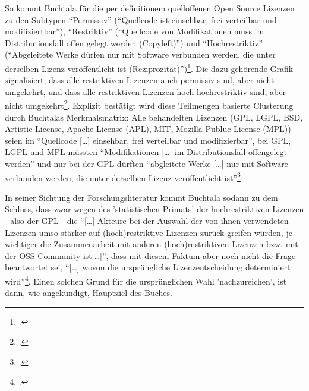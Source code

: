 \documentclass[DIV=calc,BCOR=5mm,11pt,headings=small,oneside,abstract=true, toc=bib]{scrartcl}
\begin{document}
So kommt Buchtala für die per definitionem quelloffenen Open Source Lizenzen zu
den Subtypen \enquote{Permissiv} (\enquote{Quellcode ist einsehbar, frei
verteilbar und modifiziertbar}), \enquote{Restriktiv}
(\enquote{Quellcode von Modifikationen muss im Distributionsfall offen gelegt
werden (Copyleft)}) und \enquote{Hochrestriktiv} (\enquote{Abgeleitete
Werke dürfen nur mit Software verbunden werden, die unter derselben Lizenz
veröffentlicht ist (Reziprozität)})\footcite[cf.][57 (Typo im
Original)]{Buchtala2007a}. Die dazu gehörende Grafik signalisiert, dass alle
restriktiven Lizenzen auch permissiv sind, aber nicht umgekehrt, und dass alle
restriktiven Lizenzen hoch hochrestriktiv sind, aber nicht
umgekehrt\footcite[cf.][57]{Buchtala2007a}. Explizit bestätigt wird diese
Teilmengen basierte Clusterung durch Buchtalas Merkmalsmatrix: Alle behandelten
Lizenzen (GPL, LGPL, BSD, Artistic License, Apache License (APL), MIT, Mozilla
Publuc License (MPL)) seien im \enquote{Quellcode [\ldots] einsehbar, frei
verteilbar und modifizierbar}, bei GPL, LGPL und MPL müssten
\enquote{Modifikationen [\ldots] im Distributionsfall offengelegt werden}
und nur bei der GPL dürften \enquote{abgleitete Werke [\ldots] nur mit Software
verbunden werden, die unter derselben Lizenz veröffentlicht
ist}\footcite[cf.][62]{Buchtala2007a}

In seiner Sichtung der Forschungsliteratur kommt Buchtala sodann zu dem Schluss,
dass zwar wegen des 'statistischen Primats' der hochrestriktiven Lizenzen - also
der GPL - die \enquote{[\ldots] Akteure bei der Auswahl der von ihnen verwendeten
Lizenzen umso stärker auf (hoch)restriktive Lizenzen zurück greifen würden, je
wichtiger die Zusammenarbeit mit anderen (hoch)restriktiven Lizenzen bzw. mit
der OSS-Community ist[\ldots]}, dass mit diesem Faktum aber noch nicht die
Frage beantwortet sei, \enquote{[\ldots] wovon die ursprüngliche
Lizenzentscheidung determiniert
wird}\footcite[cf.][156]{Buchtala2007a}. Einen solchen Grund für die
ursprünglichen Wahl 'nachzureichen', ist dann, wie angekündigt, Hauptziel des
Buches.
\end{document}
